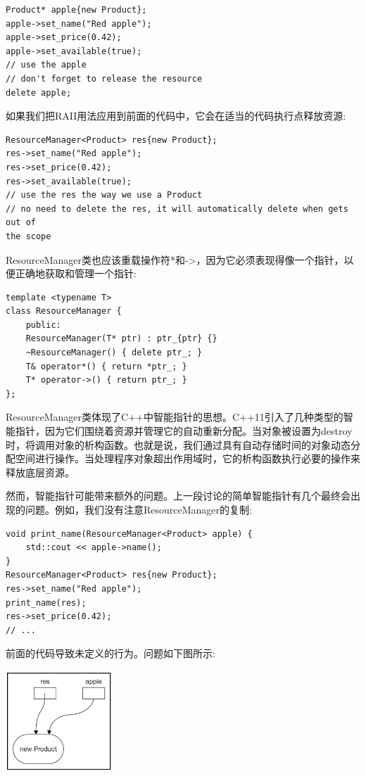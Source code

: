 \begin{lstlisting}[caption={}]
Product* apple{new Product};
apple->set_name("Red apple");
apple->set_price(0.42);
apple->set_available(true);
// use the apple
// don't forget to release the resource
delete apple;
\end{lstlisting}

如果我们把RAII用法应用到前面的代码中，它会在适当的代码执行点释放资源: \par

\begin{lstlisting}[caption={}]
ResourceManager<Product> res{new Product};
res->set_name("Red apple");
res->set_price(0.42);
res->set_available(true);
// use the res the way we use a Product
// no need to delete the res, it will automatically delete when gets out of
the scope
\end{lstlisting}

ResourceManager类也应该重载操作符*和->，因为它必须表现得像一个指针，以便正确地获取和管理一个指针: \par

\begin{lstlisting}[caption={}]
template <typename T>
class ResourceManager {
	public:
	ResourceManager(T* ptr) : ptr_{ptr} {}
	~ResourceManager() { delete ptr_; }
	T& operator*() { return *ptr_; }
	T* operator->() { return ptr_; }
};
\end{lstlisting}

ResourceManager类体现了C++中智能指针的思想。C++11引入了几种类型的智能指针，因为它们围绕着资源并管理它的自动重新分配。当对象被设置为destroy时，将调用对象的析构函数。也就是说，我们通过具有自动存储时间的对象动态分配空间进行操作。当处理程序对象超出作用域时，它的析构函数执行必要的操作来释放底层资源。\par
然而，智能指针可能带来额外的问题。上一段讨论的简单智能指针有几个最终会出现的问题。例如，我们没有注意ResourceManager的复制: \par

\begin{lstlisting}[caption={}]
void print_name(ResourceManager<Product> apple) {
	std::cout << apple->name();
}
ResourceManager<Product> res{new Product};
res->set_name("Red apple");
print_name(res);
res->set_price(0.42);
// ...
\end{lstlisting}

前面的代码导致未定义的行为。问题如下图所示:\par

\begin{center}
	\includegraphics[width=0.3\textwidth]{content/Section-1/Chapter-5/13}
\end{center}

